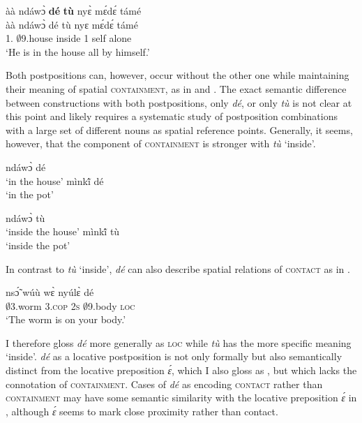 \ea \label{detu2}
  \glll   àà ndáwɔ̀ {\bfseries dé} {\bfseries tù} nyɛ̀ mɛ́dɛ́ támé   \\
           àà ndáwɔ̀ dé tù nyɛ mɛ́dɛ́ támé      \\
          1.{\COP} $\emptyset$9.house {\LOC} inside 1 self alone \\
    \trans `He is in the house all by himself.'
\z

Both postpositions can, however, occur without the other one while maintaining their meaning of spatial \textsc{containment}, as in  and . The exact semantic difference between constructions with both postpositions, only {\itshape dé}, or only {\itshape tù} is not clear at this point and likely requires a systematic study of postposition combinations with a large set of different nouns as spatial reference points.  Generally, it seems, however, that the component of \textsc{containment} is stronger with {\itshape tù} `inside'.



\ea \label{deNde}
  \ea  ndáwɔ̀ dé \\ `in the house'
\ex mìnkĩ́ dé \\ `in the pot'
\z
\z

\ea \label{deNtu}
  \ea  ndáwɔ̀ tù \\ `inside the house'
\ex mìnkĩ́ tù  \\ `inside the pot'
\z
\z


In contrast to {\itshape tù} `inside', {\itshape dé} can also describe spatial relations of \textsc{contact} as in .

\ea \label{decontact}
  \gll   nsɔ̃́ wúù wɛ̀ nyúlɛ̀ dé \\
           $\emptyset$3.worm 3.\textsc{cop} 2\textsc{s}   $\emptyset$9.body \textsc{loc}  \\
    \trans `The worm is on your body.'
\z

\noindent I therefore gloss {\itshape dé} more generally as \textsc{loc} while {\itshape tù} has the more specific meaning `inside'. {\itshape dé} as a locative postposition is not only formally but also semantically distinct from the locative preposition {\itshape ɛ́}, which I also gloss as {\LOC}, but which lacks the connotation of \textsc{containment}. Cases of {\itshape dé} as encoding \textsc{contact} rather than \textsc{containment} may have some semantic similarity with the locative preposition {\itshape ɛ́} in , although {\itshape ɛ́} seems to mark close proximity rather than contact.

